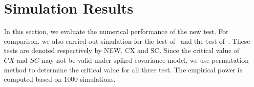 \documentclass[12pt]{article} %
\DeclareMathOperator{\mytr}{tr}
\DeclareMathOperator{\myE}{E}
\newcommand{\bZ}{\mathbf{Z}}
\newcommand{\bX}{\mathbf{X}}
\theoremstyle{definition}
\begin{document}
%






\section{Simulation Results}

In this section, we evaluate the numerical performance of the new test. For comparison, we also carried out simulation for the test of~\citet{Cai2014High} and the test of~\citet{Schott2007Some}.
These tests are denoted respectively by NEW, CX and SC.
Since the critical value of $CX$ and $SC$ may not be valid under spiked covariance model, we use permutation method to determine the critical value for all three test.
The empirical power is computed based on $1000$ simulations.
\end{document}
